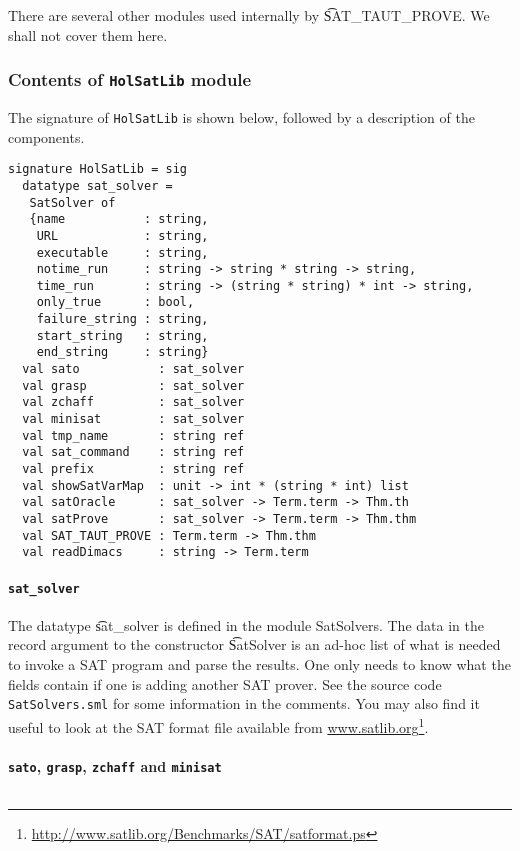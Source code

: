 There are several other modules used internally by \t{SAT\_TAUT\_PROVE}. We shall not cover them here.
\medskip

\subsubsection{Contents of {\tt HolSatLib} module}

The signature of {\tt HolSatLib} is shown below, followed
by a description of the components.

{\small\begin{verbatim}
signature HolSatLib = sig
  datatype sat_solver = 
   SatSolver of 
   {name           : string,
    URL            : string,
    executable     : string,    
    notime_run     : string -> string * string -> string,    
    time_run       : string -> (string * string) * int -> string,      
    only_true      : bool,
    failure_string : string,
    start_string   : string,  
    end_string     : string}
  val sato           : sat_solver
  val grasp          : sat_solver
  val zchaff         : sat_solver
  val minisat        : sat_solver
  val tmp_name       : string ref
  val sat_command    : string ref
  val prefix         : string ref
  val showSatVarMap  : unit -> int * (string * int) list
  val satOracle      : sat_solver -> Term.term -> Thm.th
  val satProve       : sat_solver -> Term.term -> Thm.thm
  val SAT_TAUT_PROVE : Term.term -> Thm.thm
  val readDimacs     : string -> Term.term
\end{verbatim}}

\paragraph{\tt sat\_solver}${}$\\

The datatype \t{sat\_solver}  is defined in the module {SatSolvers}.
The data in the record argument to the constructor \t{SatSolver}
is an ad-hoc list of what is needed to invoke a SAT program
and parse the results. One only needs to know what the fields
contain if one is adding another SAT prover. See the
source code {\tt SatSolvers.sml} for some information
in the comments. You may also find it useful to look at the SAT format file available from \url{www.satlib.org}\footnote{\url{http://www.satlib.org/Benchmarks/SAT/satformat.ps}}.

\paragraph{{\tt sato}, {\tt grasp}, {\tt zchaff} and {\tt minisat}}${}$\\

